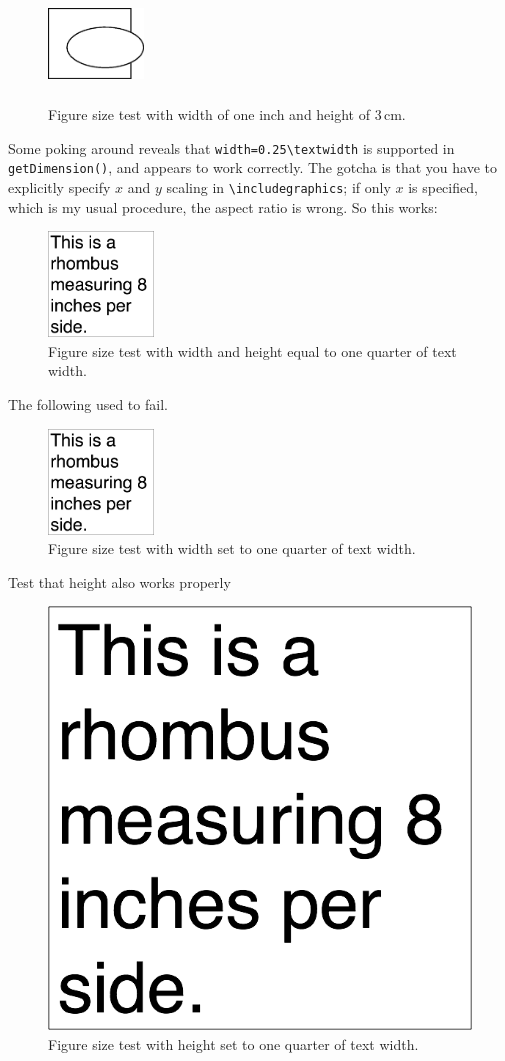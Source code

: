 \documentclass{article}
\begin{document}
\begin{figure}
\begin{center}
\includegraphics[width=1in,height=3cm]{fig_oval.png}
\caption{Figure size test with width of one inch and height of 3\,cm.} 
\end{center}
\end{figure}

Some poking around reveals that \verb#width=0.25\textwidth# is supported in \verb#getDimension()#, and appears to work correctly.  The gotcha is that you have to explicitly specify $x$ and $y$ scaling in \verb#\includegraphics#; if only $x$ is specified, which is my usual procedure, the aspect ratio is wrong. So this works:

\begin{figure}
\begin{center}
\includegraphics[width=0.25\textwidth,height=0.25\textwidth]{fig_testf.png}
\end{center}
\caption{Figure size test with width and height equal to one quarter of text width.} 
\end{figure}

The following used to fail.

\begin{figure}
\begin{center}
\includegraphics[width=0.25\textwidth]{fig_testf.png}
\caption{Figure size test with width set to one quarter of text width.} 
\end{center}
\end{figure}

Test that height also works properly
\begin{figure}
\begin{center}
\includegraphics[height=0.25\textwidth]{fig_testf.png}
\caption{Figure size test with height set to one quarter of text width.} 
\end{center}
\end{figure}
\end{document}

